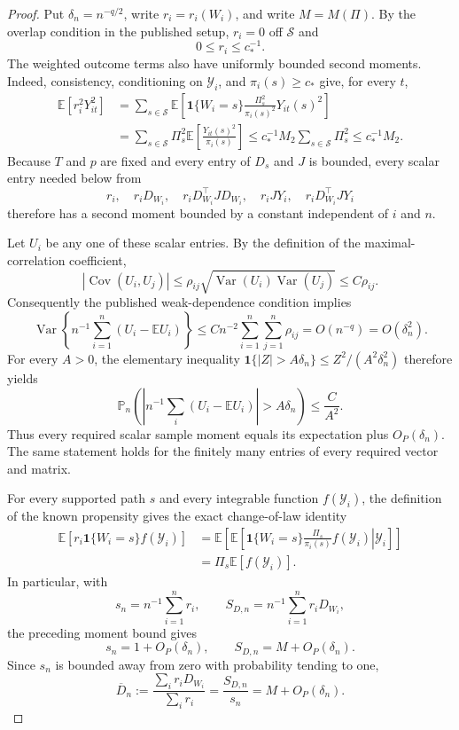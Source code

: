 \documentclass{article}
\begin{document}
\begin{proof}
Put \(\delta_n=n^{-q/2}\), write \(r_i=r_i(W_i)\), and write \(M=M(\Pi)\). By the overlap condition in the published setup, \(r_i=0\) off \(\mathcal S\) and
\[
0\leq r_i\leq c_*^{-1}.
\]
The weighted outcome terms also have uniformly bounded second moments. Indeed, consistency, conditioning on \(\mathscr Y_i\), and \(\pi_i(s)\geq c_*\) give, for every \(t\),
\[
\begin{aligned}
\mathbb E\!\left[r_i^2Y_{it}^2\right]
&=\sum_{s\in\mathcal S}\mathbb E\!\left[
  \mathbf 1\{W_i=s\}\frac{\Pi_s^2}{\pi_i(s)^2}Y_{it}(s)^2
\right]\\
&=\sum_{s\in\mathcal S}\Pi_s^2
  \mathbb E\!\left[\frac{Y_{it}(s)^2}{\pi_i(s)}\right]
\leq c_*^{-1}M_2\sum_{s\in\mathcal S}\Pi_s^2
\leq c_*^{-1}M_2.
\end{aligned}
\]
Because \(T\) and \(p\) are fixed and every entry of \(D_s\) and \(J\) is bounded, every scalar entry needed below from
\[
r_i,\quad r_iD_{W_i},\quad r_iD_{W_i}^{\top}JD_{W_i},
\quad r_iJY_i,\quad r_iD_{W_i}^{\top}JY_i
\]
therefore has a second moment bounded by a constant independent of \(i\) and \(n\).

Let \(U_i\) be any one of these scalar entries. By the definition of the maximal-correlation coefficient,
\[
\left|\operatorname{Cov}(U_i,U_j)\right|
\leq \rho_{ij}
\sqrt{\operatorname{Var}(U_i)\operatorname{Var}(U_j)}
\leq C\rho_{ij}.
\]
Consequently the published weak-dependence condition implies
\[
\operatorname{Var}\!\left\{n^{-1}\sum_{i=1}^{n}
(U_i-\mathbb E U_i)\right\}
\leq Cn^{-2}\sum_{i=1}^{n}\sum_{j=1}^{n}\rho_{ij}
=O(n^{-q})=O(\delta_n^2).
\]
For every \(A>0\), the elementary inequality
\(\mathbf 1\{|Z|>A\delta_n\}\leq Z^2/(A^2\delta_n^2)\)
therefore yields
\[
\mathbb P_n\!\left(
\left|n^{-1}\sum_i(U_i-\mathbb E U_i)\right|>A\delta_n
\right)\leq \frac{C}{A^2}.
\]
Thus every required scalar sample moment equals its expectation plus \(O_P(\delta_n)\). The same statement holds for the finitely many entries of every required vector and matrix.

For every supported path \(s\) and every integrable function \(f(\mathscr Y_i)\), the definition of the known propensity gives the exact change-of-law identity
\[
\begin{aligned}
\mathbb E\!\left[r_i\mathbf 1\{W_i=s\}f(\mathscr Y_i)\right]
&=\mathbb E\!\left[
  \mathbb E\!\left[
   \left.\mathbf 1\{W_i=s\}\frac{\Pi_s}{\pi_i(s)}f(\mathscr Y_i)
   \right|\mathscr Y_i\right]
\right]\\
&=\Pi_s\mathbb E[f(\mathscr Y_i)].
\end{aligned}
\]
In particular, with
\[
s_n=n^{-1}\sum_{i=1}^{n}r_i,
\qquad
S_{D,n}=n^{-1}\sum_{i=1}^{n}r_iD_{W_i},
\]
the preceding moment bound gives
\[
s_n=1+O_P(\delta_n),
\qquad
S_{D,n}=M+O_P(\delta_n).
\]
Since \(s_n\) is bounded away from zero with probability tending to one,
\[
\overline D_n:=\frac{\sum_i r_iD_{W_i}}{\sum_i r_i}
=\frac{S_{D,n}}{s_n}=M+O_P(\delta_n).
\]


\end{proof}
\end{document}
